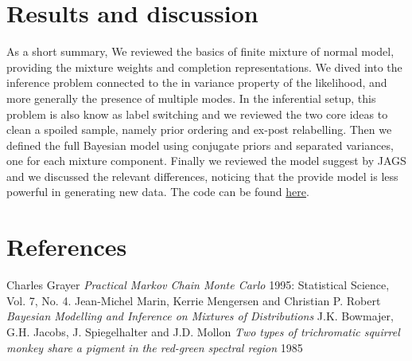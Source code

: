 \documentclass{article}
\begin{document}
\section{Results and discussion}
As a short summary, We reviewed the basics of finite mixture of normal model, providing the mixture weights and completion representations. We dived into the inference problem connected to the in variance property of the likelihood, and more generally the presence of multiple modes. In the inferential setup, this problem is also know as label switching and we reviewed the two core ideas to clean a spoiled sample, namely prior ordering and ex-post relabelling. Then we defined the full Bayesian model using conjugate priors and separated variances, one for each mixture component. Finally we reviewed the model suggest by JAGS and we discussed the relevant differences, noticing that the provide model is less powerful in generating new data. The code can be found \href{https://github.com/d3sm0/mixgauss}{here}.

\section{References}
\begin{reference}
     Charles Grayer {\em Practical Markov Chain Monte Carlo} 
    1995: Statistical Science, Vol. 7, No. 4.
     Jean-Michel Marin, Kerrie Mengersen and Christian P. Robert {\em
    Bayesian Modelling and Inference on Mixtures of Distributions}
     J.K. Bowmajer, G.H. Jacobs, J. Spiegelhalter and J.D. Mollon{\em
    Two types of trichromatic squirrel monkey share a pigment in the red-green spectral region}
    1985
\end{reference}
\end{document}
